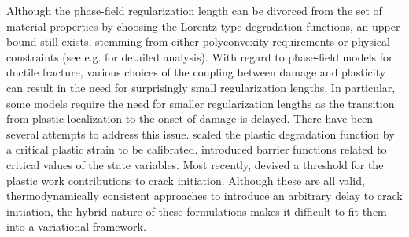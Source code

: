 Although the phase-field regularization length can be divorced from the set of material properties by choosing the Lorentz-type degradation functions, an upper bound still exists, stemming from either polyconvexity requirements or physical constraints (see e.g. \cite{wu2017unified, geelen2019phase} for detailed analysis). With regard to phase-field models for ductile fracture, various choices of the coupling between damage and plasticity can result in the need for surprisingly small regularization lengths.  In particular, some models require the need for smaller regularization lengths as the transition from plastic localization to the onset of damage is delayed.
There have been several attempts to address this issue. \citet{ambati_phase-field_2015,ambati_phase-field_2016} scaled the plastic degradation function by a critical plastic strain to be calibrated. \citet{miehe2015phase} introduced barrier functions related to critical values of the state variables. Most recently, \citet{borden_phase-field_2016} devised a threshold for the plastic work contributions to crack initiation. Although these are all valid, thermodynamically consistent approaches to introduce an arbitrary delay to crack initiation, the hybrid nature of these formulations makes it difficult to fit them into a variational framework.

